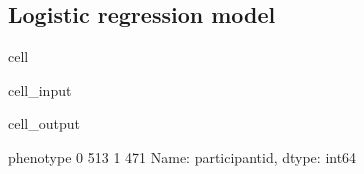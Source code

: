\documentclass[letterpaper,10pt,english]{jupyterBook}
\begin{document}
\subsection{Logistic regression model}
\label{\detokenize{Cooper:id13}}
\begin{sphinxuseclass}{cell}\begin{sphinxVerbatimInput}

\begin{sphinxuseclass}{cell_input}
\begin{sphinxVerbatim}[commandchars=\\\{\}]
  \PYG{p}{[}\PYG{p}{]}
  \PYG{p}{[}\PYG{p}{[}\PYG{p}{]}\PYG{p}{]}
  \PYG{p}{[}\PYG{p}{]}
     
\PYG{p}{[}\PYG{p}{]}
\end{sphinxVerbatim}

\end{sphinxuseclass}\end{sphinxVerbatimInput}
\begin{sphinxVerbatimOutput}

\begin{sphinxuseclass}{cell_output}
\begin{sphinxVerbatim}[commandchars=\\\{\}]
phenotype
0    513
1    471
Name: participant\PYGZus{}id, dtype: int64
\end{sphinxVerbatim}

\end{sphinxuseclass}\end{sphinxVerbatimOutput}

\end{sphinxuseclass}
\end{document}
